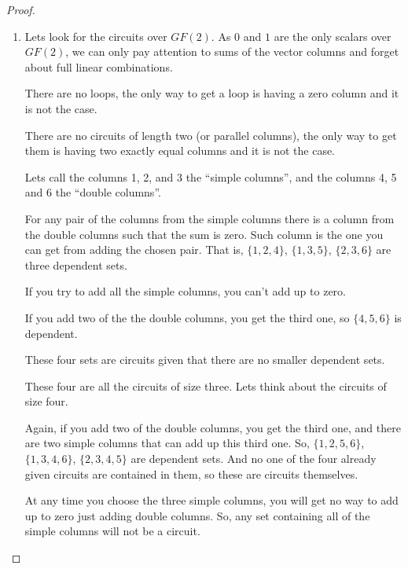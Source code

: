 \begin{proof}\label{t1:p1}
    \begin{enumerate}[label=(\roman*)]
        \item\label{t1:p1:i}
            Lets look for the circuits over $GF(2)$. As $0$ and $1$ are the only scalars over $GF(2)$,
            we can only pay attention to sums of the vector columns and forget about full linear combinations.\pn
            
            There are no loops, the only way to get a loop is having a zero column and it is not the case.\pn
            
            There are no circuits of length two (or parallel columns), the only way to get them is having two 
            exactly equal columns and it is not the case.\pn
            
            Lets call the columns 1, 2, and 3 the ``simple columns'', and the columns 4, 5 and 6 the ``double columns''.\pn
            
            For any pair of the columns from the simple columns there is a column from the double columns 
            such that the sum is zero. Such column is the one you can get from adding the chosen pair. 
            That is, $\{1, 2, 4\}$, $\{1, 3, 5\}$, $\{2, 3, 6\}$ are three dependent sets.\pn
            
            If you try to add all the simple columns, you can't add up to zero.\pn
            
            If you add two of the the double columns, you get the third one, so $\{4, 5, 6\}$ is dependent.\pn
            
            These four sets are circuits given that there are no smaller dependent sets.\pn
            
            These four are all the circuits of size three. Lets think about the circuits of size four.\pn
            
            Again, if you add two of the double columns, you get the third one, and there are two simple columns that can
            add up this third one. So, $\{1, 2, 5, 6\}$, $\{1, 3, 4, 6\}$, $\{2, 3, 4, 5\}$ are dependent sets.
            And no one of the four already given circuits are contained in them, so these are circuits themselves.\pn
            
            At any time you choose the three simple columns, you will get no way to add up to zero just adding double columns.
            So, any set containing all of the simple columns will not be a circuit.\pn
            

\end{enumerate}
\end{proof}
